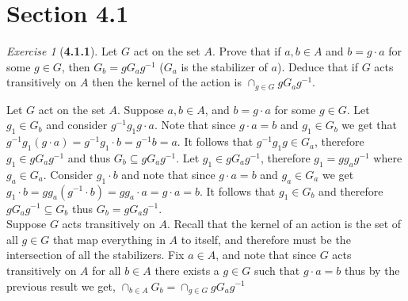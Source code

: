 \documentclass[12pt]{amsart}
\makeatletter
\theoremstyle{remark}
\newtheorem*{exercise}{Exercise}%
\renewenvironment{proof}[1][\proofname]{\par\doublespacing
  \pushQED{\qed}%
  \normalfont \topsep6\p@\@plus6\p@\relax
  \list{}{%
    \settowidth{\leftmargin}{\itshape\proofname:\hskip\labelsep}%
    \setlength{\labelwidth}{0pt}%
    \setlength{\itemindent}{-\leftmargin}%
  }%
  \item[\hskip\labelsep\itshape#1\@addpunct{:}]\ignorespaces
}{%
  \popQED\endlist\@endpefalse
  \singlespacing
}
\theoremstyle{mycomment}
\makeatother
\begin{document}
\thispagestyle{fancy}
\author{Coordinator: Coordinator's Name}








\section*{\textbf{Section 4.1}}

\begin{exercise}[\textbf{4.1.1}] Let $G$ act on the set $A$. Prove that if $a, b \in A$ and 
  $b = g\cdot a$ for some $g \in G$, then $G_b = gG_ag^{-1}$ ($G_a$ is the stabilizer of $a$). 
  Deduce that if $G$ acts transitively on $A$ then the kernel of the action is $\cap_{g \in G} gG_ag^{-1}$. 
  \begin{proof} Let $G$ act on the set $A$. Suppose $a, b \in A$, and $b = g\cdot a$ for some $g \in G$. Let $g_1 \in G_b$ and consider 
    $g^{-1}g_1g \cdot a$. Note that since $g \cdot a = b$ and $g_1 \in G_b$ we get that $g^{-1}g_1(g \cdot a) = g^{-1}g_1\cdot b = g^{-1}b = a$.
    It follows that $g^{-1}g_1g \in G_a$, therefore $g_1\in gG_ag^{-1}$ and thus $G_b \subseteq gG_ag^{-1}$. Let $g_1 \in gG_ag^{-1}$, therefore 
    $g_1 = gg_ag^{-1}$ where $g_a \in G_a$. Consider $g_1 \cdot b$ and note that since $g \cdot a = b$ and $g_a \in G_a$ we get 
    $g_1 \cdot b = gg_a(g^{-1} \cdot b) = gg_a \cdot a = g \cdot a = b$. It follows that $g_1 \in G_b$ and therefore $gG_ag^{-1} \subseteq G_b$ thus 
    $G_b = gG_ag^{-1}$.\\

    Suppose $G$ acts transitively on $A$. Recall that the kernel of an action is the set of all $g \in G$ that map 
    everything in $A$ to itself, and therefore must be the intersection of all the stabilizers. Fix $a \in A$, and note that since 
    $G$ acts transitively on $A$ for all $b \in A$ there exists a $g \in G$ such that $g\cdot a = b$ thus by the previous result we get,
    $\cap_{b \in A} G_b = \cap_{g \in G} gG_ag^{-1}$
  
  \end{proof}
\end{exercise}
\vspace{.15in}
\end{document}
